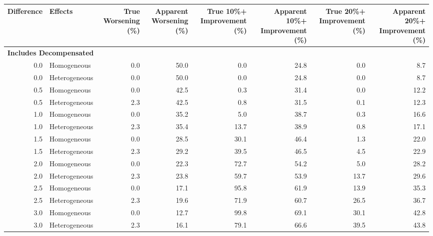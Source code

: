 \documentclass[
]{article}
\begin{document}
\begin{table}[H]
\centering
\begin{tabular}{r|l|r|r|r|r|r|r}
\hline
Difference & Effects & True Worsening (\%) & Apparent Worsening (\%) & True 10\%+ Improvement (\%) & Apparent 10\%+ Improvement (\%) & True 20\%+ Improvement (\%) & Apparent 20\%+ Improvement (\%)\\
\hline
\multicolumn{8}{l}{\textbf{Includes Decompensated}}\\
\hline
\hspace{1em}0.0 & Homogeneous & 0.0 & 50.0 & 0.0 & 24.8 & 0.0 & 8.7\\
\hline
\hspace{1em}0.0 & Heterogeneous & 0.0 & 50.0 & 0.0 & 24.8 & 0.0 & 8.7\\
\hline
\hspace{1em}0.5 & Homogeneous & 0.0 & 42.5 & 0.3 & 31.4 & 0.0 & 12.2\\
\hline
\hspace{1em}0.5 & Heterogeneous & 2.3 & 42.5 & 0.8 & 31.5 & 0.1 & 12.3\\
\hline
\hspace{1em}1.0 & Homogeneous & 0.0 & 35.2 & 5.0 & 38.7 & 0.3 & 16.6\\
\hline
\hspace{1em}1.0 & Heterogeneous & 2.3 & 35.4 & 13.7 & 38.9 & 0.8 & 17.1\\
\hline
\hspace{1em}1.5 & Homogeneous & 0.0 & 28.5 & 30.1 & 46.4 & 1.3 & 22.0\\
\hline
\hspace{1em}1.5 & Heterogeneous & 2.3 & 29.2 & 39.5 & 46.5 & 4.5 & 22.9\\
\hline
\hspace{1em}2.0 & Homogeneous & 0.0 & 22.3 & 72.7 & 54.2 & 5.0 & 28.2\\
\hline
\hspace{1em}2.0 & Heterogeneous & 2.3 & 23.8 & 59.7 & 53.9 & 13.7 & 29.6\\
\hline
\hspace{1em}2.5 & Homogeneous & 0.0 & 17.1 & 95.8 & 61.9 & 13.9 & 35.3\\
\hline
\hspace{1em}2.5 & Heterogeneous & 2.3 & 19.6 & 71.9 & 60.7 & 26.5 & 36.7\\
\hline
\hspace{1em}3.0 & Homogeneous & 0.0 & 12.7 & 99.8 & 69.1 & 30.1 & 42.8\\
\hline
\hspace{1em}3.0 & Heterogeneous & 2.3 & 16.1 & 79.1 & 66.6 & 39.5 & 43.8\\

\end{tabular}
\end{table}
\end{document}
